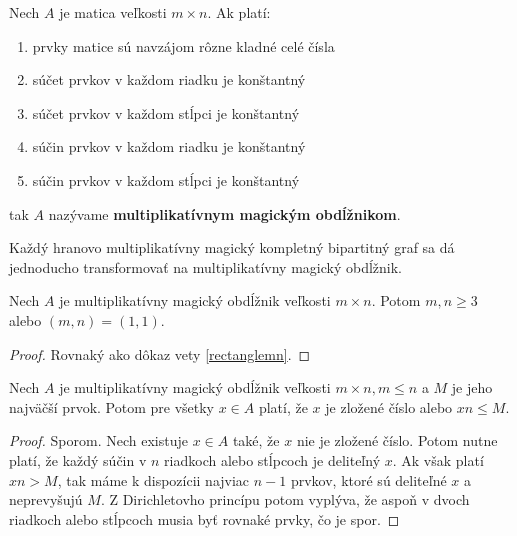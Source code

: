 \begin{definition} Nech $A$ je matica veľkosti $m \times n$. Ak platí:

\begin{enumerate}
\item prvky matice sú navzájom rôzne kladné celé čísla
\item súčet prvkov v každom riadku je konštantný
\item súčet prvkov v každom stĺpci je konštantný
\item súčin prvkov v každom riadku je konštantný
\item súčin prvkov v každom stĺpci je konštantný
\end{enumerate}

tak $A$ nazývame \textbf{multiplikatívnym magickým obdĺžnikom}.
\end{definition} 

Každý hranovo multiplikatívny magický kompletný bipartitný graf sa dá jednoducho transformovať na multiplikatívny magický obdĺžnik. \\

\begin{theorem} Nech $A$ je multiplikatívny magický obdĺžnik veľkosti $m \times n$. Potom $m,n \geq 3$ alebo $(m, n) = (1, 1)$.
\end{theorem}

\begin{proof} Rovnaký ako dôkaz vety \ref{rectanglemn}.
\end{proof}

\begin{theorem}
\label{rectanglemax}
Nech $A$ je multiplikatívny magický obdĺžnik veľkosti $m \times n, m \leq n$ a $M$ je jeho najväčší prvok. Potom pre všetky $x \in A$ platí, že $x$ je zložené číslo alebo $xn \leq M$.
\end{theorem}

\begin{proof} Sporom. Nech existuje $x \in A$ také, že $x$ nie je zložené číslo. Potom nutne platí, že každý súčin v $n$ riadkoch alebo stĺpcoch je deliteľný $x$. Ak však platí $xn > M$, tak máme k dispozícii najviac $n-1$ prvkov, ktoré sú deliteľné $x$ a neprevyšujú $M$. Z Dirichletovho princípu potom vyplýva, že aspoň v dvoch riadkoch alebo stĺpcoch musia byť rovnaké prvky, čo je spor.
\end{proof}

